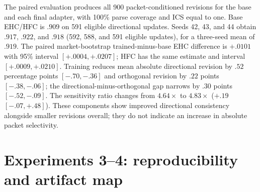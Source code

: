 The paired evaluation produces all 900 packet-conditioned revisions for the base
and each final adapter, with 100\% parse coverage and ICS equal to one. Base
EHC/HFC is $.909$ on 591 eligible directional updates. Seeds 42, 43, and 44 obtain
$.917$, $.922$, and $.918$ (592, 588, and 591 eligible updates), for a
three-seed mean of $.919$. The paired market-bootstrap trained-minus-base EHC
difference is $+.0101$ with 95\% interval $[+.0004,+.0207]$; HFC has the same
estimate and interval $[+.0009,+.0210]$. Training reduces mean absolute
directional revision by $.52$ percentage points $[-.70,-.36]$ and orthogonal
revision by $.22$ points $[-.38,-.06]$; the directional-minus-orthogonal gap
narrows by $.30$ points $[-.52,-.09]$. The sensitivity ratio changes from
$4.64\times$ to $4.83\times$ ($+.19$ $[-.07,+.48]$). These components show
improved directional consistency alongside smaller revisions overall; they do
not indicate an increase in absolute packet selectivity.
\begin{center}
\begin{minipage}{.82\linewidth}
\centering
{}
\label{tab:exp3b-update-seed-results}
\scriptsize
\setlength{\tabcolsep}{4pt}
\resizebox{\linewidth}{!}{%

}
\end{minipage}
\end{center}



\section{Experiments 3--4: reproducibility and artifact map}
\label{app:exp3-repro}

